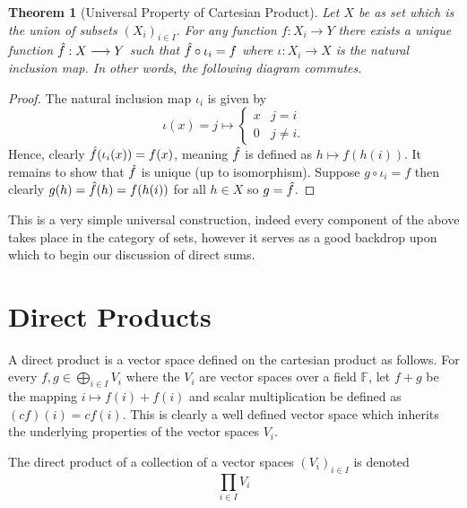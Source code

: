 \documentclass[12pt]{extarticle}
\newtheorem{theorem}{Theorem}[section]
\renewcommand{\mapsto}[0]{\longmapsto}
\renewcommand{\to}[0]{\longrightarrow}
\newcommand{\F}{{\mathbb{F}}}
\begin{document}
\begin{theorem}[Universal Property of Cartesian Product]
  Let $X$ be as set which is the union of subsets $(X_i)_{i \in I}$. For any function $f : X_i \to Y$ there exists a unique function $\Hat{f} : X \to Y$ such that $\Hat{f} \circ \iota_i = f$ where $\iota : X_i \to X$ is the natural inclusion map. In other words, the following diagram commutes.
  \begin{center}
  \end{center}

\end{theorem}  

\begin{proof}
  The natural inclusion map $\iota_i$ is given by 
  \[
    \iota(x) = j \mapsto \begin{cases}
      x & j = i \\
      0 & j \neq i.
    \end{cases}
  \]
  Hence, clearly $\Hat{f}(\iota_i(x)) = f(x)$, meaning $\Hat{f}$ is defined as $h \mapsto f(h(i))$. It remains to show that $\Hat{f}$ is unique (up to isomorphism). Suppose $g \circ \iota_i = f$ then clearly $g(h) = \Hat{f}(h) = f(h(i))$ for all $h \in X$ so $g = \Hat{f}$.
\end{proof}

This is a very simple universal construction, indeed every component of the above takes place in the category of sets, however it serves as a good backdrop upon which to begin our discussion of direct sums.

\section{Direct Products}

A direct product is a vector space defined on the cartesian product as follows. For every $f, g \in \bigoplus_{i \in I} V_i$  where the $V_i$ are vector spaces over a field $\F$, let $f + g$ be the mapping $i \mapsto f(i) + f(i)$ and scalar multiplication be defined as $(cf)(i) = cf(i)$. This is clearly a well defined vector space which inherits the underlying properties of the vector spaces $V_i$. 

The direct product of a collection of a vector spaces $(V_i)_{i \in I}$ is denoted 
\[
  \prod_{i \in I} V_i 
\]
\end{document}
